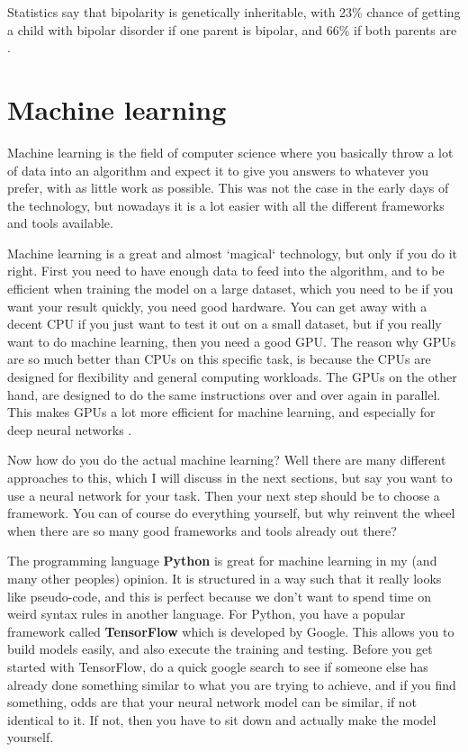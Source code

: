 Statistics say that bipolarity is genetically inheritable, with 23\% chance of getting a child with bipolar disorder 
if one parent is bipolar, and 66\% if both parents are \cite{bipolar_statistics}. 


\newpage
\section{Machine learning}
Machine learning is the field of computer science where you basically throw a lot of data into an algorithm
and expect it to give you answers to whatever you prefer, with as little work as possible. 
This was not the case in the early days of the technology, but nowadays it is a lot easier with all the different 
frameworks and tools available.

Machine learning is a great and almost `magical` technology, but only if you do it right.
First you need to have enough data to feed into the algorithm, and to be efficient when training the model on a 
large dataset, which you need to be if you want your result quickly, you need good hardware. You can get away with a 
decent CPU if you just want to test it out on a small dataset, but if you really want to do machine learning,
then you need a good GPU. The reason why GPUs are so much better than CPUs on this specific task, 
is because the CPUs are designed for flexibility and general computing workloads. The GPUs on the other hand, 
are designed to do the same instructions over and over again in parallel. This makes GPUs a lot more efficient for 
machine learning, and especially for deep neural networks \cite{cpu_vs_gpu_ml}. 

Now how do you do the actual machine learning? Well there are many different approaches to this, which I will discuss 
in the next sections, but say you want to use a neural network for your task. Then your next step should be to 
choose a framework. You can of course do everything yourself, but why reinvent the wheel when there are so many good 
frameworks and tools already out there? 

The programming language \textbf{Python} is great for machine learning in my (and many other peoples) opinion. 
It is structured in a way such that it really looks like pseudo-code, and this is perfect because we don't want to 
spend time on weird syntax rules in another language. For Python, you have a popular framework called \textbf{TensorFlow} 
which is developed by Google. This allows you to build models easily, and also execute the training and testing. 
Before you get started with TensorFlow, do a quick google search to see if someone else has already done something 
similar to what you are trying to achieve, and if you find something, odds are that your neural network model can be 
similar, if not identical to it. If not, then you have to sit down and actually make the model yourself. 

